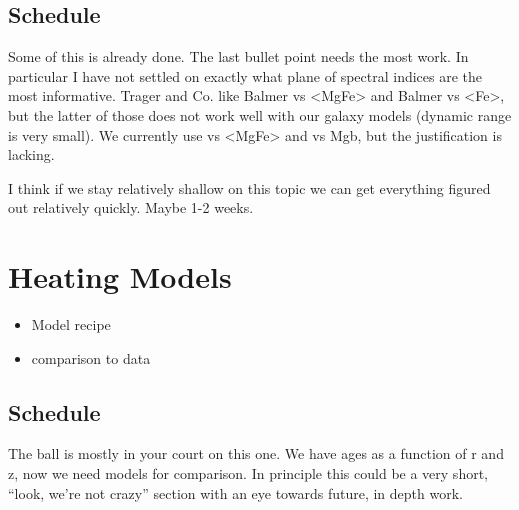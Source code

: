 \subsection{Schedule}
Some of this is already done. The last bullet point needs the most work. In
particular I have not settled on exactly what plane of spectral indices are
the most informative. Trager and Co. like Balmer vs <MgFe> and Balmer vs <Fe>,
but the latter of those does not work well with our galaxy models (dynamic
range is very small). We currently use \Hd vs <MgFe> and \Hd vs Mgb, but the
justification is lacking.

I think if we stay relatively shallow on this topic we can get everything
figured out relatively quickly. Maybe 1-2 weeks.

\section{Heating Models}
\begin{itemize}
  \item Model recipe
  \item comparison to data
\end{itemize}
\subsection{Schedule}
The ball is mostly in your court on this one. We have ages as a function of r
and z, now we need models for comparison. In principle this could be a very
short, ``look, we're not crazy'' section with an eye towards future, in depth
work.



